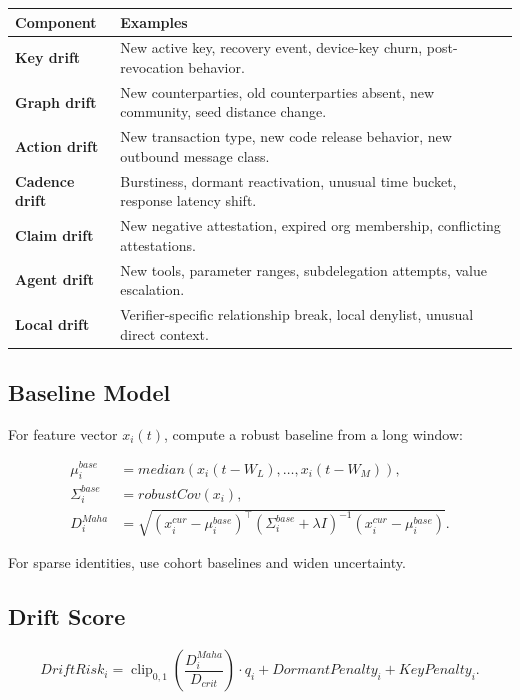 \documentclass[11pt]{article}
\begin{document}
\begin{center}
\begin{tabularx}{\textwidth}{>{\bfseries}p{} X}
\toprule
Component & Examples \\
\midrule
Key drift & New active key, recovery event, device-key churn, post-revocation behavior. \\
Graph drift & New counterparties, old counterparties absent, new community, seed distance change. \\
Action drift & New transaction type, new code release behavior, new outbound message class. \\
Cadence drift & Burstiness, dormant reactivation, unusual time bucket, response latency shift. \\
Claim drift & New negative attestation, expired org membership, conflicting attestations. \\
Agent drift & New tools, parameter ranges, subdelegation attempts, value escalation. \\
Local drift & Verifier-specific relationship break, local denylist, unusual direct context. \\
\bottomrule
\end{tabularx}
\end{center}

\subsection{Baseline Model}

For feature vector \(x_i(t)\), compute a robust baseline from a long window:

\begin{align}
\mu_i^{base} &= median(x_i(t-W_L),\ldots,x_i(t-W_M)),\\
\Sigma_i^{base} &= robustCov(x_i),\\
D_i^{Maha} &= \sqrt{(x_i^{cur}-\mu_i^{base})^\top(\Sigma_i^{base}+\lambda I)^{-1}(x_i^{cur}-\mu_i^{base})}.
\end{align}

For sparse identities, use cohort baselines and widen uncertainty.

\subsection{Drift Score}

\begin{equation}
DriftRisk_i=\operatorname{clip}_{0,1}\left(\frac{D_i^{Maha}}{D_{crit}}\right)\cdot q_i + DormantPenalty_i + KeyPenalty_i.
\end{equation}
\end{document}
